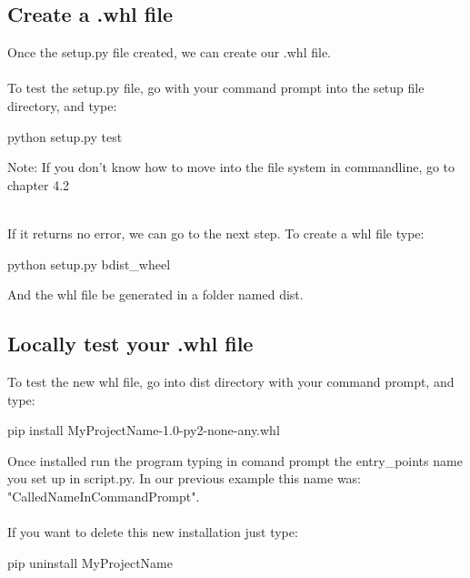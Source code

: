 \documentclass[10pt,letterpaper]{article}
\begin{document}
\subsection {Create a .whl file}
Once the setup.py file created, we can create our .whl file.\\
\\To test the setup.py file, go with your command prompt into the setup file directory, and type:
\begin{mdframed}[backgroundcolor=black, fontcolor=white]
python setup.py test
\end{mdframed}
\begin{itshape}
 \medbreak
Note: If you don't know how to move into the file system in commandline, go to chapter 4.2\\
\end{itshape}
\\If it returns no error, we can go to the next step.
To create a whl file type:
\begin{mdframed}[backgroundcolor=black, fontcolor=white]
python setup.py bdist\_wheel
\end{mdframed}
And the whl file be generated in a folder named dist.\\
\subsection {Locally test your .whl file}
To test the new whl file, go into dist directory with your command prompt, and type:
\begin{mdframed}[backgroundcolor=black, fontcolor=white]
pip install MyProjectName-1.0-py2-none-any.whl
\end{mdframed}
Once installed run the program typing in comand prompt the entry\_points name you set up in script.py. In our previous example this name was: "CalledNameInCommandPrompt".\\
\\If you want to delete this new installation just type:
\begin{mdframed}[backgroundcolor=black, fontcolor=white]
pip uninstall MyProjectName
\end{mdframed}
\end{document}
